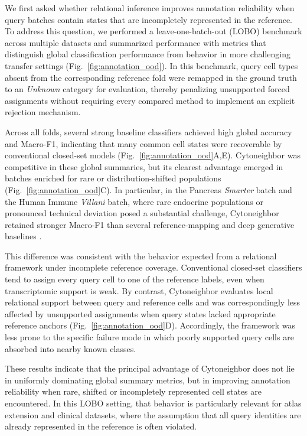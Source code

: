\documentclass[11pt]{article}
\begin{document}
We first asked whether relational inference improves annotation reliability when query batches contain states that are incompletely represented in the reference. To address this question, we performed a leave-one-batch-out (LOBO) benchmark across multiple datasets and summarized performance with metrics that distinguish global classification performance from behavior in more challenging transfer settings (Fig.~\ref{fig:annotation_ood}). In this benchmark, query cell types absent from the corresponding reference fold were remapped in the ground truth to an \textit{Unknown} category for evaluation, thereby penalizing unsupported forced assignments without requiring every compared method to implement an explicit rejection mechanism.

Across all folds, several strong baseline classifiers achieved high global accuracy and Macro-F1, indicating that many common cell states were recoverable by conventional closed-set models (Fig.~\ref{fig:annotation_ood}A,E). Cytoneighbor was competitive in these global summaries, but its clearest advantage emerged in batches enriched for rare or distribution-shifted populations (Fig.~\ref{fig:annotation_ood}C). In particular, in the Pancreas \textit{Smarter} batch and the Human Immune \textit{Villani} batch, where rare endocrine populations or pronounced technical deviation posed a substantial challenge, Cytoneighbor retained stronger Macro-F1 than several reference-mapping and deep generative baselines \cite{Segerstolpe2016Pancreas,Xin2016Pancreas,Lawlor2017Pancreas,Villani2017Immune}.

This difference was consistent with the behavior expected from a relational framework under incomplete reference coverage. Conventional closed-set classifiers tend to assign every query cell to one of the reference labels, even when transcriptomic support is weak. By contrast, Cytoneighbor evaluates local relational support between query and reference cells and was correspondingly less affected by unsupported assignments when query states lacked appropriate reference anchors (Fig.~\ref{fig:annotation_ood}D). Accordingly, the framework was less prone to the specific failure mode in which poorly supported query cells are absorbed into nearby known classes.

These results indicate that the principal advantage of Cytoneighbor does not lie in uniformly dominating global summary metrics, but in improving annotation reliability when rare, shifted or incompletely represented cell states are encountered. In this LOBO setting, that behavior is particularly relevant for atlas extension and clinical datasets, where the assumption that all query identities are already represented in the reference is often violated.
\end{document}
